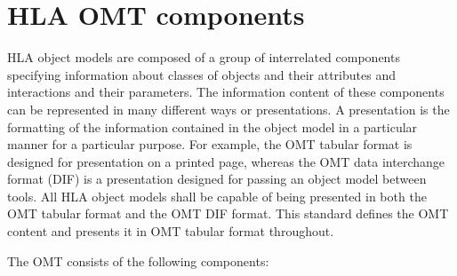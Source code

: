 \section{HLA OMT components}
HLA object models are composed of a group of interrelated components specifying information about classes of objects and their attributes and interactions and their parameters. The information content of these components can be represented in many different ways or presentations. A presentation is the formatting of the information contained in the object model in a particular manner for a particular purpose. For example, the OMT tabular format is designed for presentation on a printed page, whereas the OMT data interchange format (DIF) is a presentation designed for passing an object model between tools. All HLA object models shall be capable of being presented in both the OMT tabular format and the OMT DIF format. This standard defines the OMT content and presents it in OMT tabular format throughout.

The OMT consists of the following components:
